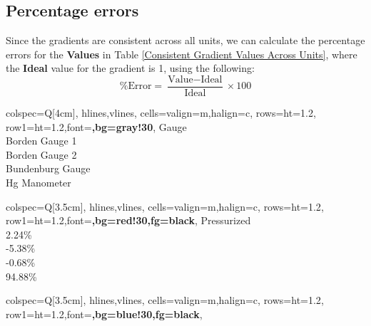 \documentclass{article}
\begin{document}
	\subsection{Percentage errors}
	Since the gradients are consistent across all units, we can calculate the percentage errors for the \textbf{Values} in Table \ref{Consistent Gradient Values Across Units}, where the \textbf{Ideal} value for the gradient is 1, using the following:
	\begin{equation}
		\% \text{Error} = \frac{\text{Value} - \text{Ideal}}{\text{Ideal}} \times 100
	\end{equation}
\vspace{0.2em}
	\begin{center}	
		\hspace*{-1em}
	\begin{minipage}[t]{3cm}
		\centering
		\begin{tblr}{
				colspec={Q[4cm]},
				hlines,vlines,
				cells={valign=m,halign=c},
				rows={ht=1.2\baselineskip},
				row{1}={ht=1.2\baselineskip,font=\bfseries,bg=gray!30},
			}
			Gauge \\
			Borden Gauge 1 \\
			Borden Gauge 2 \\
			Bundenburg Gauge \\
			Hg Manometer \\
		\end{tblr}
	\end{minipage}
	\hspace{3.5em}
	\begin{minipage}[t]{3.5cm}
		\centering
		\begin{tblr}{
				colspec={Q[3.5cm]},
				hlines,vlines,
				cells={valign=m,halign=c},
				rows={ht=1.2\baselineskip},
				row{1}={ht=1.2\baselineskip,font=\bfseries,bg=red!30,fg=black},
			}
			Pressurized \\
			{2.24\%}\\ %
			{-5.38\%} \\ %
			{-0.68\%} \\ %
			{94.88\%} \\%
		\end{tblr}
	\end{minipage}
	\hspace{1em}
	\begin{minipage}[t]{3.5cm}
		\centering
		\begin{tblr}{
				colspec={Q[3.5cm]},
				hlines,vlines,
				cells={valign=m,halign=c},
				rows={ht=1.2\baselineskip},
				row{1}={ht=1.2\baselineskip,font=\bfseries,bg=blue!30,fg=black},
			}

\end{tblr}
\end{minipage}
\end{center}
\end{document}

